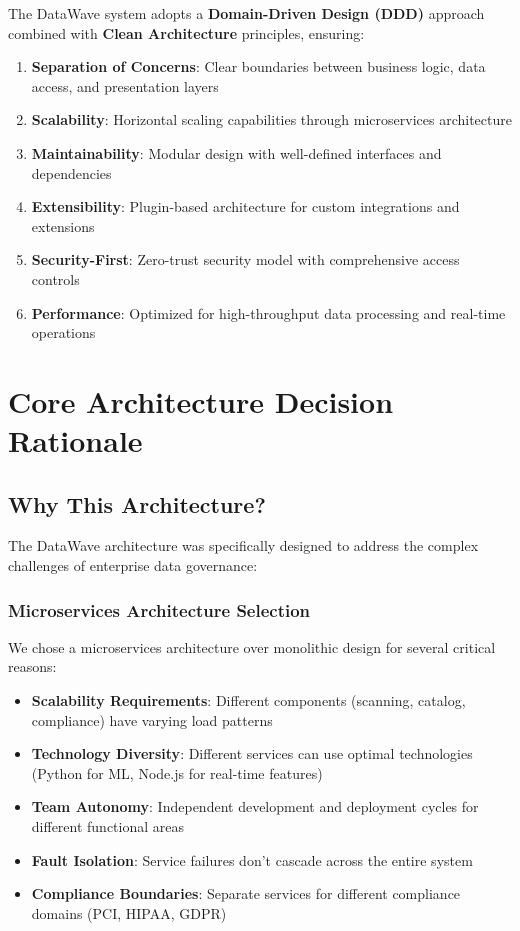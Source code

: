 \documentclass[12pt,a4paper]{article}
\begin{document}
The DataWave system adopts a \textbf{Domain-Driven Design (DDD)} approach combined with \textbf{Clean Architecture} principles, ensuring:

\begin{enumerate}
    \item \textbf{Separation of Concerns}: Clear boundaries between business logic, data access, and presentation layers
    \item \textbf{Scalability}: Horizontal scaling capabilities through microservices architecture
    \item \textbf{Maintainability}: Modular design with well-defined interfaces and dependencies
    \item \textbf{Extensibility}: Plugin-based architecture for custom integrations and extensions
    \item \textbf{Security-First}: Zero-trust security model with comprehensive access controls
    \item \textbf{Performance}: Optimized for high-throughput data processing and real-time operations
\end{enumerate}

\section{Core Architecture Decision Rationale}

\subsection{Why This Architecture?}

The DataWave architecture was specifically designed to address the complex challenges of enterprise data governance:

\subsubsection{Microservices Architecture Selection}

We chose a microservices architecture over monolithic design for several critical reasons:

\begin{itemize}
    \item \textbf{Scalability Requirements}: Different components (scanning, catalog, compliance) have varying load patterns
    \item \textbf{Technology Diversity}: Different services can use optimal technologies (Python for ML, Node.js for real-time features)
    \item \textbf{Team Autonomy}: Independent development and deployment cycles for different functional areas
    \item \textbf{Fault Isolation}: Service failures don't cascade across the entire system
    \item \textbf{Compliance Boundaries}: Separate services for different compliance domains (PCI, HIPAA, GDPR)
\end{itemize}
\end{document}
